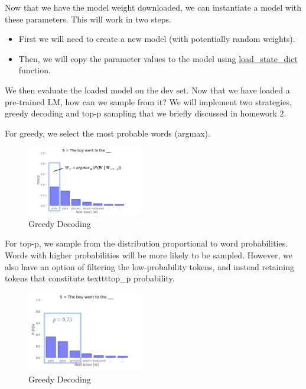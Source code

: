 Now that we have the model weight downloaded, we can instantiate a model with these parameters. This will work in two steps.
\begin{itemize}
    \item First we will need to create a new model (with potentially random weights).
    \item Then, we will copy the parameter values to the model using \href{https://pytorch.org/tutorials/beginner/saving_loading_models.html}{load\_state\_dict} function.
\end{itemize}
We then evaluate the loaded model on the dev set.
Now that we have loaded a pre-trained LM, how can we sample from it? We will implement two strategies, greedy decoding and top-p sampling \citep{holtzman2019curious} that we briefly discussed in homework 2.

For greedy, we select the most probable words (argmax).
\begin{figure}[h]
    \centering
    \includegraphics[width=0.45\textwidth]{figures/argmax_sampling.jpeg}
    \caption{Greedy Decoding}
\end{figure}

For top-p, we sample from the distribution proportional to word probabilities. Words with higher probabilities will be more likely to be sampled.
However, we also have an option of filtering the low-probability tokens, and instead retaining tokens that constitute texttt{top\_p} probability.
\begin{figure}[h]
    \centering
    \includegraphics[width=0.45\textwidth]{figures/p_sampling.jpeg}
    \caption{Greedy Decoding}
\end{figure}

